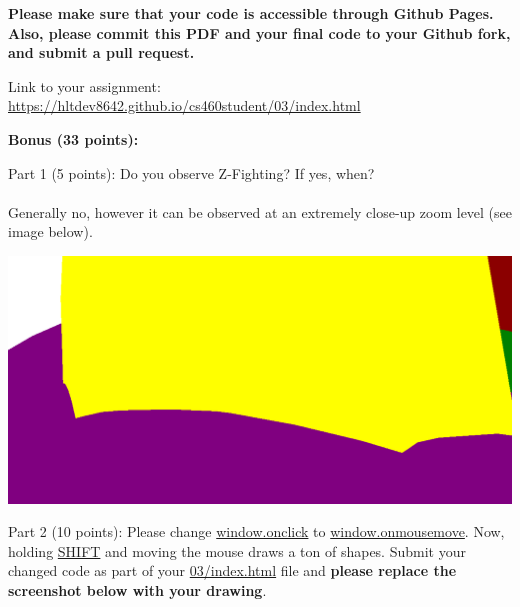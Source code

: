 \documentclass[10pt,oneside,onecolumn,letterpaper]{article}
\begin{document}
\noindent\textbf{Please make sure that your code is accessible through Github Pages. Also, please commit this PDF and your final code to your Github fork, and submit a pull request.}

\vspace{.5cm} %

Link to your assignment: \url{https://hltdev8642.github.io/cs460student/03/index.html}

\clearpage %

\noindent\textbf{Bonus (33 points):}


\vspace{.5cm} %

\noindent Part 1 (5 points): Do you observe Z-Fighting? If yes, when?
\\~\\
Generally no, however it can be observed at an extremely close-up zoom level (see image below).
\vspace{1cm}


\begin{center}
    \includegraphics[width=1.0\textwidth]{gfx/z-fighting-investigation-image-1.png}
\end{center}

\vspace{3cm}

\clearpage

\noindent Part 2 (10 points): Please change \url{window.onclick} to \url{window.onmousemove}. Now, holding \url{SHIFT} and moving the mouse draws a ton of shapes. Submit your changed code as part of your \url{03/index.html} file and \textbf{please replace the screenshot below with your drawing}.
\end{document}
